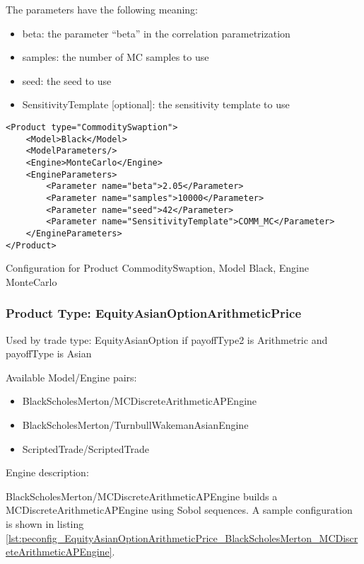 The parameters have the following meaning:

\begin{itemize}
\item beta: the parameter ``beta'' in the correlation parametrization
\item samples: the number of MC samples to use
\item seed: the seed to use
\item SensitivityTemplate [optional]: the sensitivity template to use 
\end{itemize}

\begin{longlisting}
\begin{verbatim}
<Product type="CommoditySwaption">
    <Model>Black</Model>
    <ModelParameters/>
    <Engine>MonteCarlo</Engine>
    <EngineParameters>
        <Parameter name="beta">2.05</Parameter>
        <Parameter name="samples">10000</Parameter>
        <Parameter name="seed">42</Parameter>    
        <Parameter name="SensitivityTemplate">COMM_MC</Parameter>
    </EngineParameters>
</Product>
\end{verbatim}
\caption{Configuration for Product CommoditySwaption, Model Black, Engine MonteCarlo}
\label{lst:peconfig_CommoditySwaption_Black_MonteCarlo}
\end{longlisting}
    
\subsubsection{Product Type: EquityAsianOptionArithmeticPrice}

Used by trade type: EquityAsianOption if payoffType2 is Arithmetric and payoffType is Asian

Available Model/Engine pairs:

\begin{itemize}
  \item BlackScholesMerton/MCDiscreteArithmeticAPEngine
  \item BlackScholesMerton/TurnbullWakemanAsianEngine
  \item ScriptedTrade/ScriptedTrade
\end{itemize}

Engine description:

BlackScholesMerton/MCDiscreteArithmeticAPEngine builds a MCDiscreteArithmeticAPEngine using Sobol sequences. A sample
configuration is shown in listing
\ref{lst:peconfig_EquityAsianOptionArithmeticPrice_BlackScholesMerton_MCDiscreteArithmeticAPEngine}.

